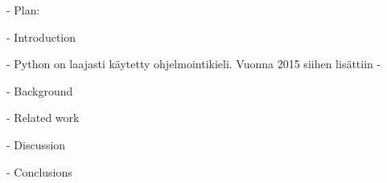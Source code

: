 
- Plan:

- Introduction

    - Python on laajasti käytetty ohjelmointikieli. Vuonna 2015 siihen lisättiin 
    - 
    

- Background

- Related work

- Discussion

- Conclusions